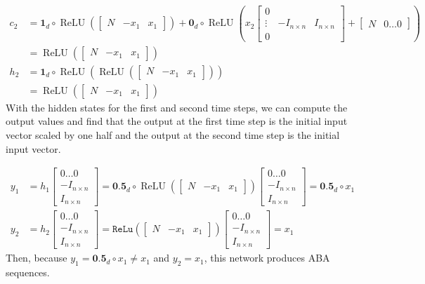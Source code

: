 \documentclass{article}
\DeclareMathOperator{\ReLU}{ReLU}
\begin{document}
\begin{align*}
  c_2 &= \textbf{1}_d \circ \ReLU \left( \begin{bmatrix} N & -x_1 & x_1 \end{bmatrix}\right) + \textbf{0}_d\circ \ReLU(x_2\begin{bmatrix} 0 &  & \\ \vdots & -I_{n \times n} & I_{n \times n}\\ 0 & &  \end{bmatrix} + \begin{bmatrix} N & 0 \dots 0\end{bmatrix}) \\
      &= \ReLU \left( \begin{bmatrix} N & -x_1 & x_1 \end{bmatrix}\right) \\[2ex]
  h_2 &= \textbf{1}_d \circ \ReLU\left(\ReLU ( \begin{bmatrix} N & -x_1 & x_1 \end{bmatrix})\right) \\
      &= \ReLU \left( \begin{bmatrix} N & -x_1 & x_1 \end{bmatrix}\right)
\end{align*}
%
With the hidden states for the first and second time steps, we can compute the output values and find that the output at the first time step is the initial input vector scaled by one half and the output at the second time step is the initial input vector.

\begin{align*}
  y_1 &= h_1\begin{bmatrix} 0 \dots 0 \\ -I_{n \times n} \\ I_{n \times n}  \end{bmatrix} = \textbf{0.5}_d\circ \ReLU\left( \begin{bmatrix} N & -x_1 & x_1 \end{bmatrix}\right) \begin{bmatrix} 0 \dots 0 \\ -I_{n \times n} \\ I_{n \times n}  \end{bmatrix} = \textbf{0.5}_d\circ x_1\\
  y_2 &= h_2\begin{bmatrix} 0 \dots 0 \\ -I_{n \times n} \\ I_{n \times n}  \end{bmatrix} = \texttt{ReLu} ( \begin{bmatrix} N & -x_1 & x_1 \end{bmatrix}) \begin{bmatrix} 0 \dots 0 \\ -I_{n \times n} \\ I_{n \times n}  \end{bmatrix} = x_1
\end{align*}
%
Then, because $y_1 = \textbf{0.5}_d\circ x_1 \not = x_1$ and $y_2 = x_1$, this network produces ABA sequences.
\end{document}
